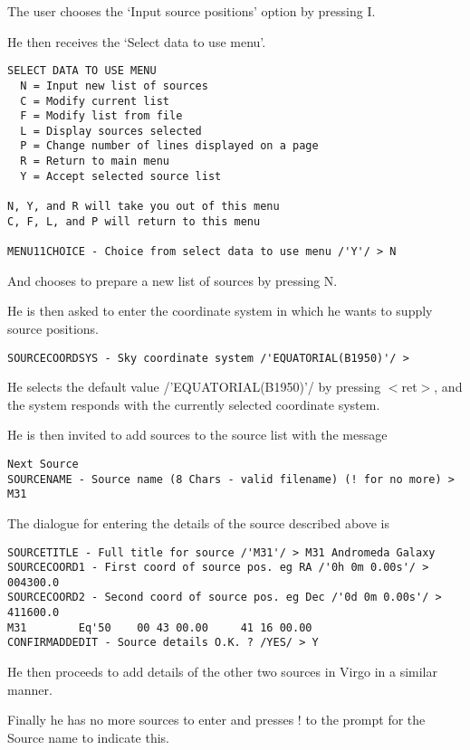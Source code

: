 \documentclass[twoside,11pt]{article}
\begin{document}
The user chooses the `Input source positions' option by pressing I.

He then receives the `Select data to use menu'.

\begin{verbatim}
SELECT DATA TO USE MENU
  N = Input new list of sources
  C = Modify current list
  F = Modify list from file
  L = Display sources selected
  P = Change number of lines displayed on a page
  R = Return to main menu
  Y = Accept selected source list

N, Y, and R will take you out of this menu
C, F, L, and P will return to this menu

MENU11CHOICE - Choice from select data to use menu /'Y'/ > N
\end{verbatim}

And chooses to prepare a new list of sources by pressing N.

He is then asked to enter the coordinate system in which he wants to supply
source positions.

\begin{verbatim}
SOURCECOORDSYS - Sky coordinate system /'EQUATORIAL(B1950)'/ >              
\end{verbatim}

He selects the default value /'EQUATORIAL(B1950)'/ by pressing $<$ret$>$,
and the system responds with the currently selected coordinate system.

He is then invited to add sources to the source list with the message

\begin{verbatim}
Next Source
SOURCENAME - Source name (8 Chars - valid filename) (! for no more) > M31
\end{verbatim}

The dialogue for entering the details of the source described above is

\begin{verbatim}
SOURCETITLE - Full title for source /'M31'/ > M31 Andromeda Galaxy
SOURCECOORD1 - First coord of source pos. eg RA /'0h 0m 0.00s'/ > 004300.0
SOURCECOORD2 - Second coord of source pos. eg Dec /'0d 0m 0.00s'/ > 411600.0
M31        Eq'50    00 43 00.00     41 16 00.00
CONFIRMADDEDIT - Source details O.K. ? /YES/ > Y
\end{verbatim}

He then proceeds to add details of the other two sources in Virgo in a similar
manner.

Finally he has no more sources to enter and presses ! to the prompt for the
Source name to indicate this.
\end{document}
